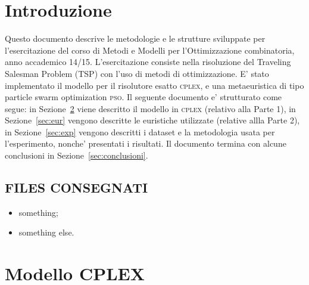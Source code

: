 \documentclass[
12pt, %
a4paper, %
oneside, %
headinclude,footinclude, %
BCOR5mm, %
]{scrartcl}
\begin{document}





\section{Introduzione}

Questo documento descrive le metodologie e le strutture sviluppate per l'esercitazione del corso di Metodi e Modelli per l'Ottimizzazione combinatoria, anno accademico 14/15. L'esercitazione consiste nella risoluzione del  Traveling Salesman Problem (TSP) con l'uso di metodi di ottimizzazione. E' stato implementato il modello per il risolutore esatto \textsc{cplex}, e una metaeuristica di tipo particle swarm optimization \textsc{pso}. Il seguente documento e' strutturato come segue: in Sezione~\ref{sec:cplex} viene descritto il modello in \textsc{cplex} (relativo alla Parte 1), in Sezione~\ref{sec:eur} vengono descritte le euristiche utilizzate (relative allla Parte 2), in Sezione~\ref{sec:exp} vengono descritti i dataset e la metodologia usata per l'esperimento, nonche' presentati i risultati. Il documento termina con alcune conclusioni in Sezione~\ref{sec:conclusioni}.

\subsection{FILES CONSEGNATI}

\begin{itemize}
\item something;
\item something else.
\end{itemize}

\section{Modello CPLEX} \label{sec:cplex}
\end{document}
